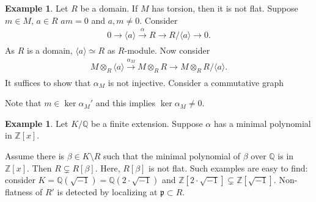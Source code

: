\documentclass[12pt]{report}
\theoremstyle{plain}
\theoremstyle{remark}
\theoremstyle{definition}
\newtheorem{example}[theorem]{Example}
\newcommand{\Z}{\mathbb{Z}}
\newcommand{\Q}{\mathbb{Q}}
\begin{document}
\begin{example}
    Let $R$ be a domain. If $M$ has torsion, then it is not flat. Suppose $m\in M$, $a\in R$ $am=0$ and $a,m\neq 0$. Consider
    \begin{align*}
        0\to\langle a\rangle \xrightarrow[]{\alpha} R\to R/\langle a\rangle\to 0.
    \end{align*}
    As $R$ is a domain, $\langle a\rangle \simeq R$ as $R$-module. Now consider
    \begin{align*}
        M\otimes_R\langle a\rangle \xrightarrow[]{\alpha_M}M\otimes_R R\to M\otimes_R R/\langle a\rangle.
    \end{align*}
    It suffices to show that $\alpha_M$ is not injective. Consider a commutative graph
    \begin{figure}[H]
        \centering
    \end{figure}
    \noindent Note that $m\in \ker\alpha_M'$ and this implies $\ker \alpha_M\neq 0$.
\end{example}

\begin{example}
    Let $K/\Q$ be a finite extension. Suppose $\alpha$ has a minimal polynomial in $\Z[x]$.
    \begin{figure}[H]
        \centering
    \end{figure}
    \noindent Assume there is $\beta\in K\setminus R$ such that the minimal polynomial of $\beta$ over $\Q$ is in $\Z[x]$. Then $R\subsetneq R[\beta]$. Here, $R[\beta]$ is not flat. Such examples are easy to find: consider $K=\Q(\sqrt{-1})=\Q(2\cdot\sqrt{-1})$ and $\Z[2\cdot\sqrt{-1}]\subsetneq\Z[\sqrt{-1}]$. Non-flatness of $R'$ is detected by localizing at $\mathfrak{p}\subset R$.
\end{example}
\end{document}
